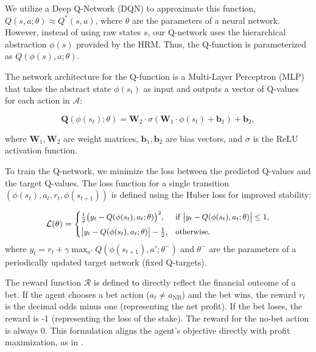\documentclass[3p,times,procedia]{elsarticle}
\begin{document}
We utilize a Deep Q-Network (DQN) \cite{mnih2015human} to approximate this function, $Q(s, a; \theta) \approx Q^*(s, a)$, where $\theta$ are the parameters of a neural network. However, instead of using raw states $s$, our Q-network uses the hierarchical abstraction $\phi(s)$ provided by the HRM. Thus, the Q-function is parameterized as $Q(\phi(s), a; \theta)$.

The network architecture for the Q-function is a Multi-Layer Perceptron (MLP) that takes the abstract state $\phi(s_t)$ as input and outputs a vector of Q-values for each action in $\mathcal{A}$:

\begin{equation}\label{eq:q-network}
\mathbf{Q}(\phi(s_t); \theta) = \mathbf{W}_2 \cdot \sigma\!\left( \mathbf{W}_1 \cdot \phi(s_t) + \mathbf{b}_1 \right) + \mathbf{b}_2,
\end{equation}

\noindent
where $\mathbf{W}_1, \mathbf{W}_2$ are weight matrices, $\mathbf{b}_1, \mathbf{b}_2$ are bias vectors, and $\sigma$ is the ReLU activation function.

To train the Q-network, we minimize the loss between the predicted Q-values and the target Q-values. The loss function for a single transition $(\phi(s_t), a_t, r_t, \phi(s_{t+1}))$ is defined using the Huber loss for improved stability:

\begin{equation}\label{eq:huber-loss}
\small
\mathcal{L}(\theta) =
\begin{cases}
\frac{1}{2} \big(y_t - Q(\phi(s_t), a_t; \theta)\big)^2, & \text{if } \big|y_t - Q(\phi(s_t), a_t; \theta)\big| \leq 1, \\[4pt]
\big|y_t - Q(\phi(s_t), a_t; \theta)\big| - \tfrac{1}{2}, & \text{otherwise},
\end{cases}
\end{equation}
where $y_t = r_t + \gamma \max_{a'} Q(\phi(s_{t+1}), a'; \theta^-)$ and $\theta^-$ are the parameters of a periodically updated target network (fixed Q-targets).

The reward function $\mathcal{R}$ is defined to directly reflect the financial outcome of a bet. If the agent chooses a bet action ($a_t \neq a_{\text{NB}}$) and the bet wins, the reward $r_t$ is the decimal odds minus one (representing the net profit). If the bet loses, the reward is -1 (representing the loss of the stake). The reward for the no-bet action is always 0. This formulation aligns the agent's objective directly with profit maximization, as in \cite{shaviroreinforcement}.
\end{document}
